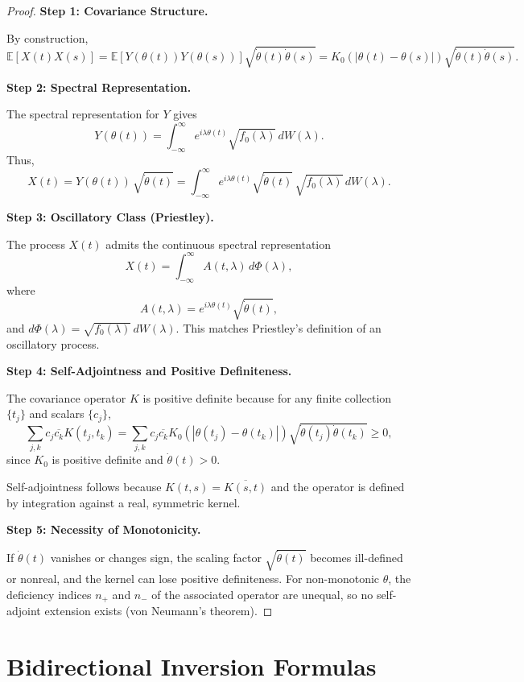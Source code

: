 \documentclass{article}
\begin{document}
\begin{proof}
\textbf{Step 1: Covariance Structure.}

By construction,
\[
\mathbb{E}[X(t) X(s)] = \mathbb{E}[Y(\theta(t))Y(\theta(s))] \sqrt{\dot\theta(t)\dot\theta(s)} = K_0(|\theta(t)-\theta(s)|)\sqrt{\dot\theta(t)\dot\theta(s)}.
\]

\textbf{Step 2: Spectral Representation.}

The spectral representation for $Y$ gives
\[
Y(\theta(t)) = \int_{-\infty}^\infty e^{i\lambda\theta(t)} \sqrt{f_0(\lambda)}\, dW(\lambda).
\]
Thus,
\[
X(t) = Y(\theta(t))\, \sqrt{\dot\theta(t)} = \int_{-\infty}^\infty e^{i\lambda\theta(t)} \sqrt{\dot\theta(t)}\, \sqrt{f_0(\lambda)}\, dW(\lambda).
\]

\textbf{Step 3: Oscillatory Class (Priestley).}

The process $X(t)$ admits the continuous spectral representation
\[
X(t) = \int_{-\infty}^\infty A(t,\lambda)\, d\Phi(\lambda),
\]
where
\[
A(t,\lambda) = e^{i\lambda\theta(t)} \sqrt{\dot\theta(t)},
\]
and $d\Phi(\lambda) = \sqrt{f_0(\lambda)}\, dW(\lambda)$. This matches Priestley's definition of an oscillatory process.

\textbf{Step 4: Self-Adjointness and Positive Definiteness.}

The covariance operator $K$ is positive definite because for any finite collection $\{t_j\}$ and scalars $\{c_j\}$,
\[
\sum_{j,k} c_j \overline{c_k} K(t_j, t_k) = \sum_{j,k} c_j \overline{c_k} K_0(|\theta(t_j)-\theta(t_k)|)\sqrt{\dot\theta(t_j)\dot\theta(t_k)} \geq 0,
\]
since $K_0$ is positive definite and $\dot\theta(t)>0$.

Self-adjointness follows because $K(t,s) = \overline{K(s,t)}$ and the operator is defined by integration against a real, symmetric kernel.

\textbf{Step 5: Necessity of Monotonicity.}

If $\dot\theta(t)$ vanishes or changes sign, the scaling factor $\sqrt{\dot\theta(t)}$ becomes ill-defined or nonreal, and the kernel can lose positive definiteness. For non-monotonic $\theta$, the deficiency indices $n_+$ and $n_-$ of the associated operator are unequal, so no self-adjoint extension exists (von Neumann's theorem).

\end{proof}

\section{Bidirectional Inversion Formulas}
\end{document}
